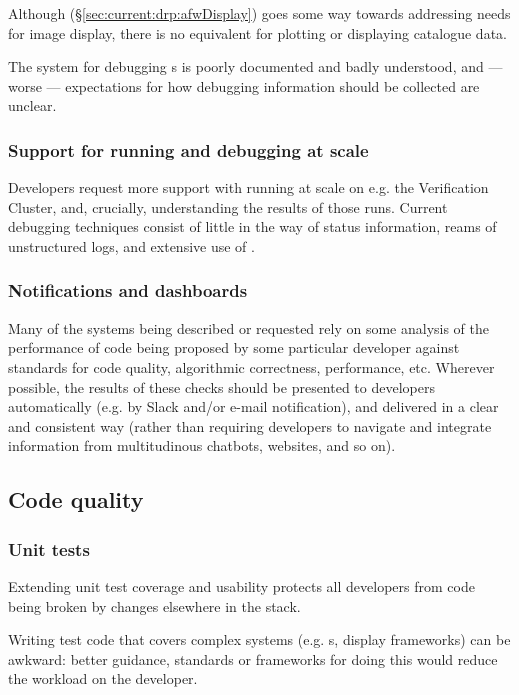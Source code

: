 \documentclass[DM,authoryear,toc,lsstdraft]{lsstdoc}
\begin{document}
Although  (\S\ref{sec:current:drp:afwDisplay}) goes some way
towards addressing needs for image display, there is no equivalent for
plotting or displaying catalogue data.

The  system for debugging s is poorly documented
and badly understood, and --- worse --- expectations for how debugging
information should be collected are unclear.

\subsubsection{Support for running and debugging at scale}

Developers request more support with running at scale on e.g. the Verification
Cluster, and, crucially, understanding the results of those runs. Current
debugging techniques consist of little in the way of status information, reams
of unstructured logs, and extensive use of .

\subsubsection{Notifications and dashboards}
\label{sec:requests:notifications}

Many of the systems being described or requested rely on some analysis of the
performance of code being proposed by some particular developer against
standards for code quality, algorithmic correctness, performance, etc.
Wherever possible, the results of these checks should be presented to
developers automatically (e.g. by Slack and/or e-mail notification), and
delivered in a clear and consistent way (rather than requiring developers to
navigate and integrate information from multitudinous chatbots, websites,
and so on).

\subsection{Code quality}

\subsubsection{Unit tests}

Extending unit test coverage and usability protects all developers from code
being broken by changes elsewhere in the stack.

Writing test code that covers complex systems (e.g. s, display
frameworks) can be awkward: better guidance, standards or frameworks for doing
this would reduce the workload on the developer.
\end{document}
